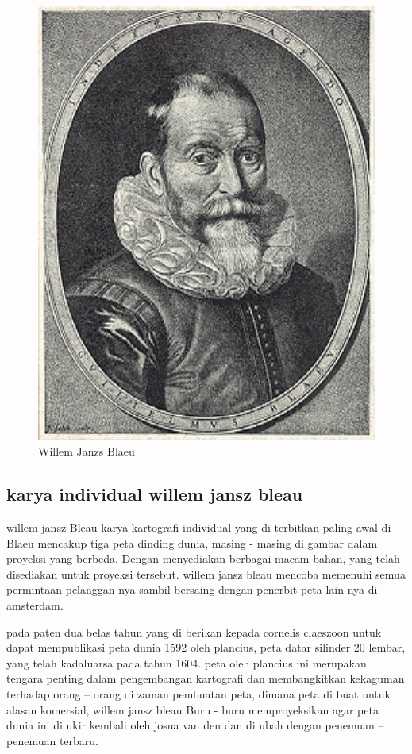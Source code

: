 \begin{figure}[ht]
\centerline{\includegraphics[width=1\textwidth]{figures/willem_jansz_blaeu.png}}	
\caption{Willem Janzs Blaeu}	
\label{willem_jansz_blaeu}
\end{figure}



\subsection{karya individual willem jansz bleau}
willem jansz Bleau karya kartografi individual yang di terbitkan paling awal di Blaeu mencakup tiga peta dinding dunia, 
masing - masing di gambar dalam proyeksi yang berbeda. Dengan menyediakan berbagai macam bahan, yang telah disediakan untuk proyeksi tersebut. 
willem jansz bleau mencoba memenuhi semua permintaan pelanggan nya sambil bersaing dengan penerbit peta lain nya di amsterdam. 


pada paten dua belas tahun yang di berikan kepada cornelis claeszoon untuk dapat mempublikasi peta dunia 1592 oleh plancius, peta datar silinder 20 lembar,
yang telah kadaluarsa pada tahun 1604. peta oleh plancius ini merupakan tengara penting dalam pengembangan kartografi dan membangkitkan kekaguman 
terhadap orang – orang di zaman pembuatan peta, dimana peta di buat untuk alasan komersial, willem jansz bleau Buru - buru memproyeksikan agar 
peta dunia ini di ukir kembali oleh josua van den dan di ubah dengan penemuan – penemuan terbaru. 


